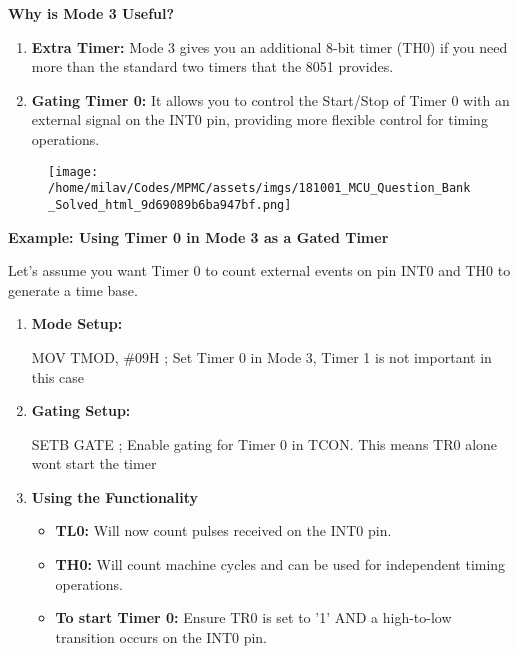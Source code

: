 \documentclass[
]{article}
\newenvironment{Shaded}{}{}
\newcommand{\NormalTok}[1]{#1}
\begin{document}
\textbf{Why is Mode 3 Useful?}

\begin{enumerate}
\def\labelenumi{\arabic{enumi}.}
\item
  \textbf{Extra Timer:} Mode 3 gives you an additional 8-bit timer (TH0)
  if you need more than the standard two timers that the 8051 provides.
\item
  \textbf{Gating Timer 0:} It allows you to control the Start/Stop of
  Timer 0 with an external signal on the INT0 pin, providing more
  flexible control for timing operations.
\end{enumerate}

\begin{figure}
\centering
\texttt{[image: /home/milav/Codes/MPMC/assets/imgs/181001\_MCU\_Question\_Bank\_Solved\_html\_9d69089b6ba947bf.png]}
\caption{}
\end{figure}

\textbf{Example: Using Timer 0 in Mode 3 as a Gated Timer}

Let's assume you want Timer 0 to count external events on pin INT0 and
TH0 to generate a time base.

\begin{enumerate}
\def\labelenumi{\arabic{enumi}.}
\item
  \textbf{Mode Setup:}

\begin{Shaded}
\begin{Highlighting}[]
\NormalTok{MOV TMOD, \#09H ; Set Timer 0 in Mode 3, Timer 1 is not important in this case}
\end{Highlighting}
\end{Shaded}
\item
  \textbf{Gating Setup:}

\begin{Shaded}
\begin{Highlighting}[]
\NormalTok{SETB GATE  ; Enable gating for Timer 0 in TCON. This means TR0 alone won\textquotesingle{}t start the timer}
\end{Highlighting}
\end{Shaded}
\item
  \textbf{Using the Functionality}

  \begin{itemize}
  \item
    \textbf{TL0:} Will now count pulses received on the INT0 pin.
  \item
    \textbf{TH0:} Will count machine cycles and can be used for
    independent timing operations.
  \item
    \textbf{To start Timer 0:} Ensure TR0 is set to '1' AND a
    high-to-low transition occurs on the INT0 pin.
  \end{itemize}
\end{enumerate}
\end{document}
